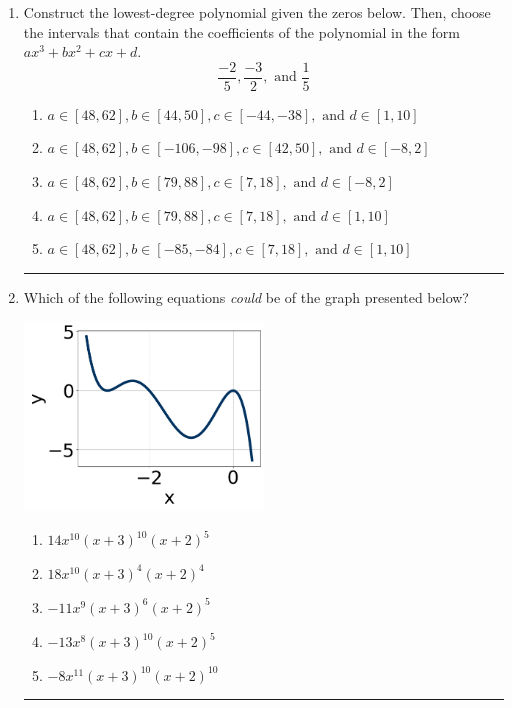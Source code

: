 \documentclass[14pt]{extbook}
\newcommand{\litem}[1]{\item#1\hspace*{-1cm}\rule{\textwidth}{0.4pt}}
\begin{document}
\begin{enumerate}
{\begin{enumerate}[label=\Alph*.]
\end{enumerate} }
\litem{
Construct the lowest-degree polynomial given the zeros below. Then, choose the intervals that contain the coefficients of the polynomial in the form $ax^3+bx^2+cx+d$.\[ \frac{-2}{5}, \frac{-3}{2}, \text{ and } \frac{1}{5} \]\begin{enumerate}[label=\Alph*.]
\item \( a \in [48, 62], b \in [44, 50], c \in [-44, -38], \text{ and } d \in [1, 10] \)
\item \( a \in [48, 62], b \in [-106, -98], c \in [42, 50], \text{ and } d \in [-8, 2] \)
\item \( a \in [48, 62], b \in [79, 88], c \in [7, 18], \text{ and } d \in [-8, 2] \)
\item \( a \in [48, 62], b \in [79, 88], c \in [7, 18], \text{ and } d \in [1, 10] \)
\item \( a \in [48, 62], b \in [-85, -84], c \in [7, 18], \text{ and } d \in [1, 10] \)

\end{enumerate} }
\litem{
Which of the following equations \textit{could} be of the graph presented below?
\begin{center}
    \includegraphics[width=0.5\textwidth]{../Figures/polyGraphToFunctionCopyC.png}
\end{center}
\begin{enumerate}[label=\Alph*.]
\item \( 14x^{10} (x + 3)^{10} (x + 2)^{5} \)
\item \( 18x^{10} (x + 3)^{4} (x + 2)^{4} \)
\item \( -11x^{9} (x + 3)^{6} (x + 2)^{5} \)
\item \( -13x^{8} (x + 3)^{10} (x + 2)^{5} \)
\item \( -8x^{11} (x + 3)^{10} (x + 2)^{10} \)


\end{enumerate}}
\end{enumerate}
\end{document}
